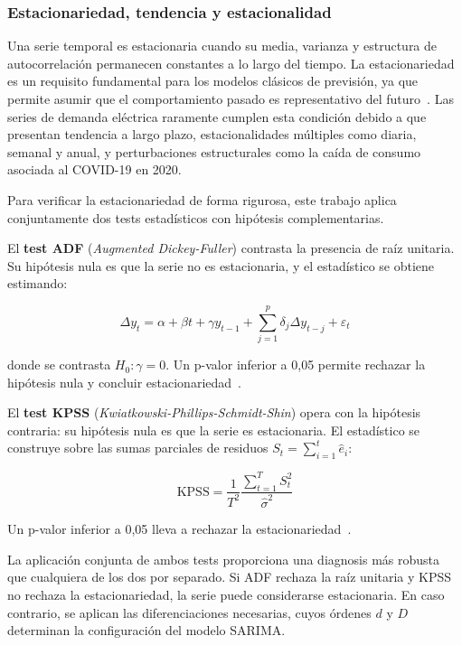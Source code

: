 \documentclass[12pt, a4paper]{article}
\begin{document}
\subsubsection{Estacionariedad, tendencia y estacionalidad}

Una serie temporal es estacionaria cuando su media, varianza y estructura de autocorrelación permanecen constantes a lo largo del tiempo. La estacionariedad es un requisito fundamental para los modelos clásicos de previsión, ya que permite asumir que el comportamiento pasado es representativo del futuro~\cite{hyndman2021}. Las series de demanda eléctrica raramente cumplen esta condición debido a que presentan tendencia a largo plazo, estacionalidades múltiples como diaria, semanal y anual, y perturbaciones estructurales como la caída de consumo asociada al COVID-19 en 2020.

Para verificar la estacionariedad de forma rigurosa, este trabajo aplica conjuntamente dos tests estadísticos con hipótesis complementarias.

El \textbf{test ADF} (\textit{Augmented Dickey-Fuller}) contrasta la presencia de raíz unitaria. Su hipótesis nula es que la serie no es estacionaria, y el estadístico se obtiene estimando:

\begin{equation}
\Delta y_t = \alpha + \beta t + \gamma y_{t-1} + \sum_{j=1}^{p} \delta_j \Delta y_{t-j} + \varepsilon_t
\end{equation}

donde se contrasta $H_0: \gamma = 0$. Un p-valor inferior a 0{,}05 permite rechazar la hipótesis nula y concluir estacionariedad~\cite{hyndman2021}.

El \textbf{test KPSS} (\textit{Kwiatkowski-Phillips-Schmidt-Shin}) opera con la hipótesis contraria: su hipótesis nula es que la serie es estacionaria. El estadístico se construye sobre las sumas parciales de residuos $S_t = \sum_{i=1}^{t} \hat{e}_i$:

\begin{equation}
\text{KPSS} = \frac{1}{T^2} \frac{\sum_{t=1}^{T} S_t^2}{\hat{\sigma}^2}
\end{equation}

Un p-valor inferior a 0{,}05 lleva a rechazar la estacionariedad~\cite{hyndman2021}.

La aplicación conjunta de ambos tests proporciona una diagnosis más robusta que cualquiera de los dos por separado. Si ADF rechaza la raíz unitaria y KPSS no rechaza la estacionariedad, la serie puede considerarse estacionaria. En caso contrario, se aplican las diferenciaciones necesarias, cuyos órdenes $d$ y $D$ determinan la configuración del modelo SARIMA.
\end{document}
